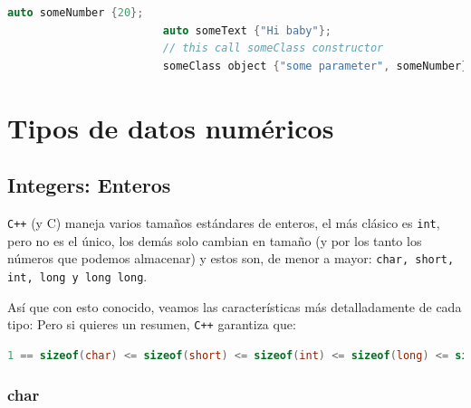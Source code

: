 \documentclass[12pt, fleqn]{report}                             %
\theoremstyle{break}                                            %
\newcommand \Cpp  {\texttt{C++} }                               %
\begin{document}
                    \begin{lstlisting}[language=C++, gobble=20]
                        auto someNumber {20};   
                        auto someText {"Hi baby"};
                        // this call someClass constructor
                        someClass object {"some parameter", someNumber};
                    \end{lstlisting}


        \clearpage
        \section{Tipos de datos numéricos}

            \subsection{Integers: Enteros}

                \Cpp (y C) maneja varios tamaños estándares de enteros, el más clásico
                es \texttt{int}, pero no es el único, los demás solo cambian en tamaño
                (y por los tanto los números que podemos almacenar)
                y estos son, de menor a mayor: \texttt{char, short, int, long y long long}.

                Así que con esto conocido, veamos las características más detalladamente de cada tipo:
                Pero si quieres un resumen, \Cpp garantiza que:
                \begin{lstlisting}[language=C++, gobble=20]
                    1 == sizeof(char) <= sizeof(short) <= sizeof(int) <= sizeof(long) <= sizeof(long long);
                \end{lstlisting}


                \subsubsection{char}
\end{document}
